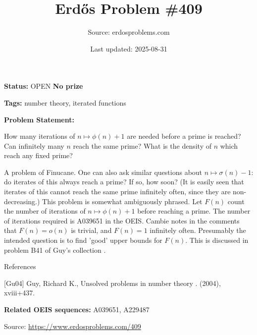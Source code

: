 \documentclass{article}
\title{Erd\H{o}s Problem \#409}
\date{Last updated: 2025-08-31}
\author{Source: erdosproblems.com}
\begin{document}
\maketitle

\noindent\textbf{Status:} OPEN \quad \textbf{No prize}

\noindent\textbf{Tags:} number theory, iterated functions

\medskip

\noindent\textbf{Problem Statement:}

How many iterations of $n\mapsto \phi(n)+1$ are needed before a prime is reached? Can infinitely many $n$ reach the same prime? What is the density of $n$ which reach any fixed prime?




A problem of Finucane. One can also ask similar questions about $n\mapsto \sigma(n)-1$: do iterates of this always reach a prime? If so, how soon? (It is easily seen that iterates of this cannot reach the same prime infinitely often, since they are non-decreasing.) This problem is somewhat ambiguously phrased. Let $F(n)$ count the number of iterations of $n\mapsto \phi(n)+1$ before reaching a prime. The number of iterations required is A039651 in the OEIS. Cambie notes in the comments that $F(n)=o(n)$ is trivial, and $F(n)=1$ infinitely often. Presumably the intended question is to find 'good' upper bounds for $F(n)$. This is discussed in problem B41 of Guy's collection \cite{Gu04}.




References

[Gu04] Guy, Richard K., Unsolved problems in number theory . (2004), xviii+437.

\noindent\textbf{Related OEIS sequences:} A039651, A229487


\bigskip
\noindent\small{Source: \url{https://www.erdosproblems.com/409}}
\end{document}
